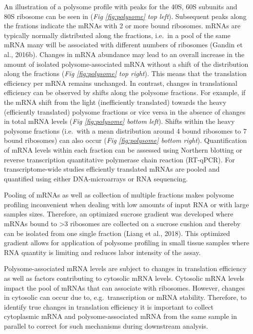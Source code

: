 \documentclass[12pt,openany]{book}
\begin{document}
An illustration of a polysome profile with peaks for the 40S, 60S
subunits and 80S ribosome can be seen in (\emph{Fig \ref{fig:polysome}
top left}). Subsequent peaks along the frations indicate the mRNAs with
2 or more bound ribosomes. mRNAs are typically normally distributed
along the fractions, i.e.~in a pool of the same mRNA many will be
associated with different numbers of ribosomes (Gandin et al., 2016b).
Changes in mRNA abundance may lead to an overall increase in the amount
of isolated polysome-associated mRNA without a shift of the distribution
along the fractions (\emph{Fig \ref{fig:polysome} top right}). This
means that the translation efficiency per mRNA remains unchanged. In
contrast, changes in translational efficiency can be observed by shifts
along the polysome fractions. For example, if the mRNA shift from the
light (inefficiently translated) towards the heavy (efficiently
translated) polysome fractions or vice versa in the absence of changes
in total mRNA levels (\emph{Fig \ref{fig:polysome} bottom left}). Shifts
within the heavy polysome fractions (i.e.~with a mean distribution
around 4 bound ribosomes to 7 bound ribosomes) can also occur (\emph{Fig
\ref{fig:polysome} bottom right}). Quantification of mRNA levels within
each fraction can be assessed using Northern blotting or reverse
transcription quantitative polymerase chain reaction (RT-qPCR). For
transcriptome-wide studies efficiently translated mRNAs are pooled and
quantified using either DNA-microarrays or RNA sequencing.

Pooling of mRNAs as well as collection of multiple fractions makes
polysome profiling inconvenient when dealing with low amounts of input
RNA or with large samples sizes. Therefore, an optimized sucrose
gradient was developed where mRNAs bound to \textgreater{}3 ribosomes
are collected on a sucrose cushion and thereby can be isolated from one
single fraction (Liang et al., 2018). This optimized gradient allows for
application of polysome profiling in small tissue samples where RNA
quantity is limiting and reduces labor intensity of the assay.

Polysome-associated mRNA levels are subject to changes in translation
efficiency as well as factors contributing to cytosolic mRNA levels.
Cytosolic mRNA levels impact the pool of mRNAs that can associate with
ribosomes. However, changes in cytosolic can occur due to,
e.g.~transcription or mRNA stability. Therefore, to identify true
changes in translation efficiency it is important to collect cytoplasmic
mRNA and polysome-associated mRNA from the same sample in parallel to
correct for such mechanisms during downstream analysis.
\end{document}
